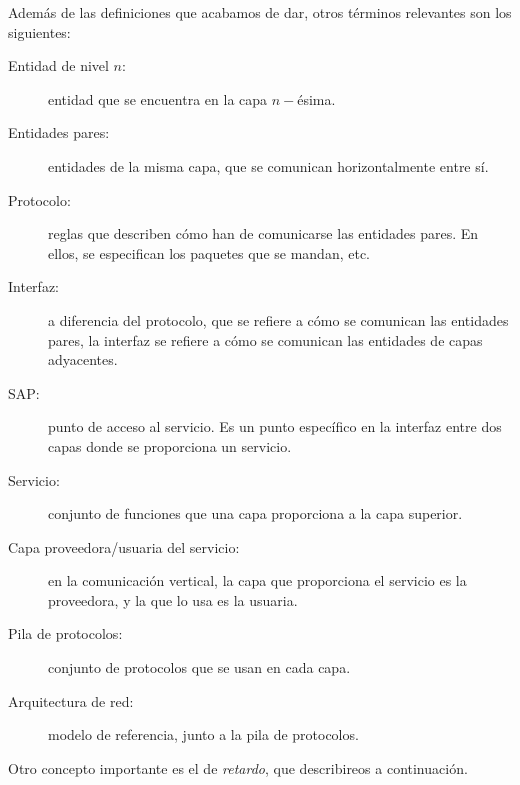 Además de las definiciones que acabamos de dar, otros términos relevantes son los siguientes:
\begin{description}
    \item [Entidad de nivel $n$:] entidad que se encuentra en la capa $n-$ésima.
    \item [Entidades pares:] entidades de la misma capa, que se comunican horizontalmente entre sí.
    \item [Protocolo:] reglas que describen cómo han de comunicarse las entidades pares. En ellos, se especifican los paquetes que se mandan, etc.
    \item [Interfaz:] a diferencia del protocolo, que se refiere a cómo se comunican las entidades pares, la interfaz se refiere a cómo se comunican las entidades de capas adyacentes.
    \item [\acrfull{SAP}:] punto de acceso al servicio. Es un punto específico en la interfaz entre dos capas donde se proporciona un servicio.
    \item [Servicio:] conjunto de funciones que una capa proporciona a la capa superior.
    \item [Capa proveedora/usuaria del servicio:] en la comunicación vertical, la capa que proporciona el servicio es la proveedora, y la que lo usa es la usuaria.
    \item [Pila de protocolos:] conjunto de protocolos que se usan en cada capa.
    \item [Arquitectura de red:] modelo de referencia, junto a la pila de protocolos.
\end{description}

Otro concepto importante es el de \emph{retardo}, que describireos a continuación.
